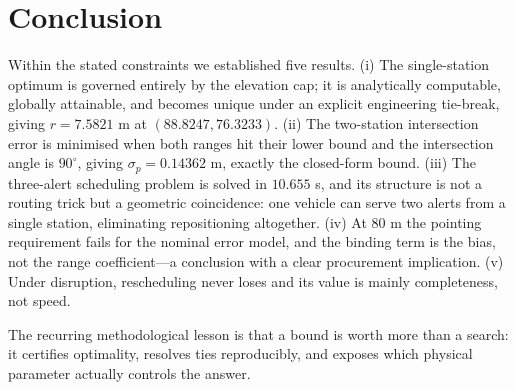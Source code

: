\documentclass[12pt]{article}
\begin{document}
\section{Conclusion}

Within the stated constraints we established five results. (i) The single-station optimum is governed entirely by the elevation cap; it is analytically computable, globally attainable, and becomes unique under an explicit engineering tie-break, giving $r=7.5821$ m at $(88.8247,76.3233)$. (ii) The two-station intersection error is minimised when both ranges hit their lower bound and the intersection angle is $90^\circ$, giving $\sigma_p=0.14362$ m, exactly the closed-form bound. (iii) The three-alert scheduling problem is solved in $10.655$ s, and its structure is not a routing trick but a geometric coincidence: one vehicle can serve two alerts from a single station, eliminating repositioning altogether. (iv) At $80$ m the pointing requirement fails for the nominal error model, and the binding term is the bias, not the range coefficient---a conclusion with a clear procurement implication. (v) Under disruption, rescheduling never loses and its value is mainly completeness, not speed.

The recurring methodological lesson is that a bound is worth more than a search: it certifies optimality, resolves ties reproducibly, and exposes which physical parameter actually controls the answer.
\end{document}
